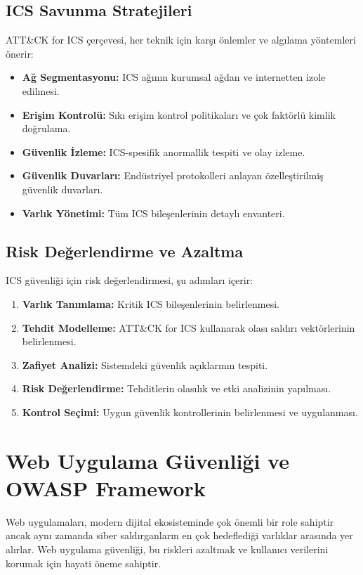 \subsection{ICS Savunma Stratejileri}

ATT\&CK for ICS çerçevesi, her teknik için karşı önlemler ve algılama yöntemleri önerir:

\begin{itemize}
\item \textbf{Ağ Segmentasyonu:} ICS ağının kurumsal ağdan ve internetten izole edilmesi.
\item \textbf{Erişim Kontrolü:} Sıkı erişim kontrol politikaları ve çok faktörlü kimlik doğrulama.
\item \textbf{Güvenlik İzleme:} ICS-spesifik anormallik tespiti ve olay izleme.
\item \textbf{Güvenlik Duvarları:} Endüstriyel protokolleri anlayan özelleştirilmiş güvenlik duvarları.
\item \textbf{Varlık Yönetimi:} Tüm ICS bileşenlerinin detaylı envanteri.
\end{itemize}

\subsection{Risk Değerlendirme ve Azaltma}

ICS güvenliği için risk değerlendirmesi, şu adımları içerir:

\begin{enumerate}
\item \textbf{Varlık Tanımlama:} Kritik ICS bileşenlerinin belirlenmesi.
\item \textbf{Tehdit Modelleme:} ATT\&CK for ICS kullanarak olası saldırı vektörlerinin belirlenmesi.
\item \textbf{Zafiyet Analizi:} Sistemdeki güvenlik açıklarının tespiti.
\item \textbf{Risk Değerlendirme:} Tehditlerin olasılık ve etki analizinin yapılması.
\item \textbf{Kontrol Seçimi:} Uygun güvenlik kontrollerinin belirlenmesi ve uygulanması.
\end{enumerate}

\section{Web Uygulama Güvenliği ve OWASP Framework}

Web uygulamaları, modern dijital ekosisteminde çok önemli bir role sahiptir ancak aynı zamanda siber saldırganların en çok hedeflediği varlıklar arasında yer alırlar. Web uygulama güvenliği, bu riskleri azaltmak ve kullanıcı verilerini korumak için hayati öneme sahiptir.

